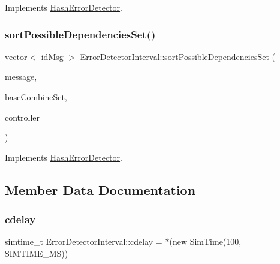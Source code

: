 Implements \hyperlink{class_hash_error_detector_ac0a25b9c1e27f98223869d11ca46d18f}{Hash\+Error\+Detector}.

\mbox{\label{class_error_detector_interval_abe98fbb4f13aeb919d2c2e8755f003ae}} 
\subsubsection{\texorpdfstring{sort\+Possible\+Dependencies\+Set()}{sortPossibleDependenciesSet()}}
{\footnotesize\ttfamily vector$<$ \hyperlink{structures_8h_a83a1d9a070efa5341da84cfd8e28d3e5}{id\+Msg} $>$ Error\+Detector\+Interval\+::sort\+Possible\+Dependencies\+Set (\begin{DoxyParamCaption}\item[{const \hyperlink{structures_8h_a7e7bdc1d2fff8a9436f2f352b2711ed6}{message\+Info} \&}]{message,  }\item[{const vector$<$ \hyperlink{structures_8h_a7e7bdc1d2fff8a9436f2f352b2711ed6}{message\+Info} $>$ \&}]{base\+Combine\+Set,  }\item[{\hyperlink{class_controller}{Controller} $\ast$}]{controller }\end{DoxyParamCaption})\hspace{0.3cm}{\ttfamily [virtual]}}



Implements \hyperlink{class_hash_error_detector_ad7419eaab728b7ed3e394d5aee9eda41}{Hash\+Error\+Detector}.



\subsection{Member Data Documentation}
\mbox{\label{class_error_detector_interval_adb614477095a1b9753f088f28776c677}} 
\subsubsection{\texorpdfstring{cdelay}{cdelay}}
{\footnotesize\ttfamily simtime\+\_\+t Error\+Detector\+Interval\+::cdelay = $\ast$(new Sim\+Time(100, S\+I\+M\+T\+I\+M\+E\+\_\+\+MS))\hspace{0.3cm}{\ttfamily [private]}}

